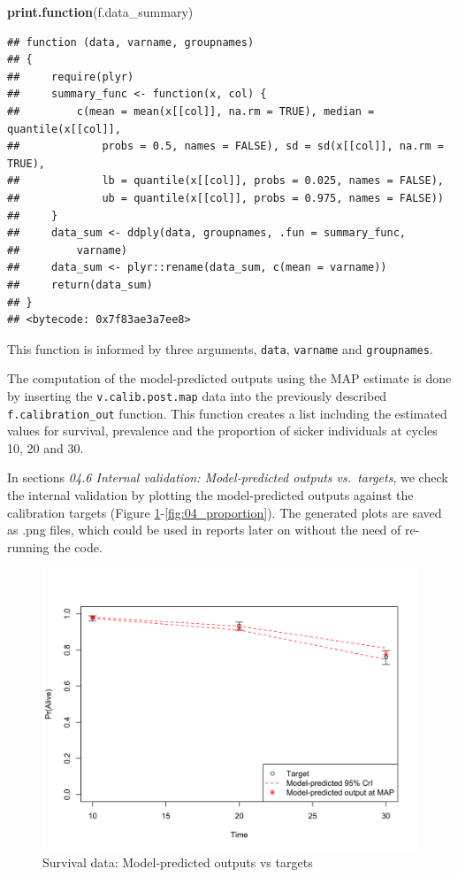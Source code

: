 \documentclass[]{article}
\newenvironment{Shaded}{\begin{snugshade}}{\end{snugshade}}
\newcommand{\KeywordTok}[1]{\textcolor[rgb]{0.13,0.29,0.53}{\textbf{#1}}}
\newcommand{\NormalTok}[1]{#1}
\begin{document}
\begin{Shaded}
\begin{Highlighting}[]
\KeywordTok{print.function}\NormalTok{(f.data_summary)}
\end{Highlighting}
\end{Shaded}

\begin{verbatim}
## function (data, varname, groupnames) 
## {
##     require(plyr)
##     summary_func <- function(x, col) {
##         c(mean = mean(x[[col]], na.rm = TRUE), median = quantile(x[[col]], 
##             probs = 0.5, names = FALSE), sd = sd(x[[col]], na.rm = TRUE), 
##             lb = quantile(x[[col]], probs = 0.025, names = FALSE), 
##             ub = quantile(x[[col]], probs = 0.975, names = FALSE))
##     }
##     data_sum <- ddply(data, groupnames, .fun = summary_func, 
##         varname)
##     data_sum <- plyr::rename(data_sum, c(mean = varname))
##     return(data_sum)
## }
## <bytecode: 0x7f83ae3a7ee8>
\end{verbatim}

This function is informed by three arguments, \texttt{data},
\texttt{varname} and \texttt{groupnames}.

The computation of the model-predicted outputs using the MAP estimate is
done by inserting the \texttt{v.calib.post.map} data into the previously
described \texttt{f.calibration\_out} function. This function creates a
list including the estimated values for survival, prevalence and the
proportion of sicker individuals at cycles 10, 20 and 30.

In sections \emph{04.6 Internal validation: Model-predicted outputs
vs.~targets}, we check the internal validation by plotting the
model-predicted outputs against the calibration targets (Figure
\ref{fig:04_surv}-\ref{fig:04_proportion}). The generated plots are
saved as .png files, which could be used in reports later on without the
need of re-running the code.

\begin{figure}
\centering
\includegraphics{../figs/04_posterior-vs-targets-survival.png}
\caption{Survival data: Model-predicted outputs vs targets
\label{fig:04_surv}}
\end{figure}
\end{document}
